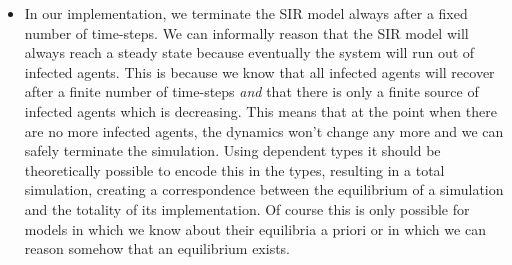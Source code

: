 \begin{itemize}
	\item In our implementation, we terminate the SIR model always after a fixed number of time-steps. We can informally reason that the SIR model will always reach a steady state because eventually the system will run out of infected agents. This is because we know that all infected agents will recover after a finite number of time-steps \textit{and} that there is only a finite source of infected agents which is decreasing. This means that at the point when there are no more infected agents, the dynamics won't change any more and we can safely terminate the simulation. Using dependent types it should be theoretically possible to encode this in the types, resulting in a total simulation, creating a correspondence between the equilibrium of a simulation and the totality of its implementation. Of course this is only possible for models in which we know about their equilibria a priori or in which we can reason somehow that an equilibrium exists.
\end{itemize}